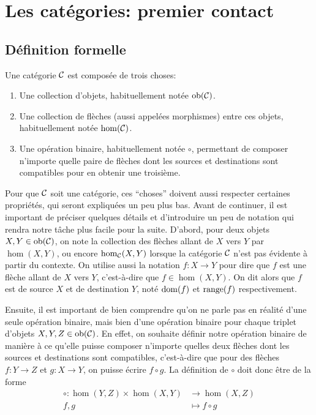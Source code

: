\section{Les catégories: premier contact}

\subsection{Définition formelle}
Une catégorie $\mathcal{C}$ est composée de trois choses:
\begin{enumerate}
    \item Une collection d'objets, habituellement notée $\mathrm{ob}(\mathcal{C})$.
    \item Une collection de flèches (aussi appelées morphismes) entre ces
          objets, habituellement notée $\hom(\mathcal{C})$.
    \item Une opération binaire, habituellement notée $\circ$, permettant de
          composer n'importe quelle paire de flèches dont les sources et
          destinations sont compatibles pour en obtenir une troisième.
\end{enumerate}

Pour que $\mathcal{C}$ soit une catégorie, ces ``choses'' doivent aussi respecter
certaines propriétés, qui seront expliquées un peu plus bas. Avant de
continuer, il est important de préciser quelques détails et d'introduire
un peu de notation qui rendra notre tâche plus facile pour la suite. D'abord,
pour deux objets $X, Y \in \mathrm{ob}(\mathcal{C})$, on note la collection des flèches allant
de $X$ vers $Y$ par $\hom(X, Y)$, ou encore $\hom_{\mathcal{C}}(X, Y)$ lorsque la catégorie
$\mathcal{C}$ n'est pas évidente à partir du contexte. On utilise aussi la notation
$f : X \to Y$ pour dire que $f$ est une flèche allant de $X$ vers $Y$,
c'est-à-dire que $f \in \hom(X, Y)$. On dit alors que $f$ est de source
$X$ et de destination $Y$, noté $\mathrm{dom}(f)$ et $\mathrm{range}(f)$ respectivement.

Ensuite, il est important de bien comprendre qu'on ne parle pas en réalité
d'une seule opération binaire, mais bien d'une opération binaire pour chaque
triplet d'objets $X, Y, Z \in \mathrm{ob}(\mathcal{C})$. En effet, on souhaite définir notre
opération binaire de manière à ce qu'elle puisse composer n'importe quelles
deux flèches dont les sources et destinations sont compatibles, c'est-à-dire
que pour des flèches $f : Y \to Z$ et $g : X \to Y$, on puisse écrire
$f \circ g$. La définition de $\circ$ doit donc être de la forme
\begin{align*}
    \circ : \hom(Y, Z) \times \hom(X, Y) &\to \hom(X, Z) \\
             f, g &\mapsto f \circ g
\end{align*}

